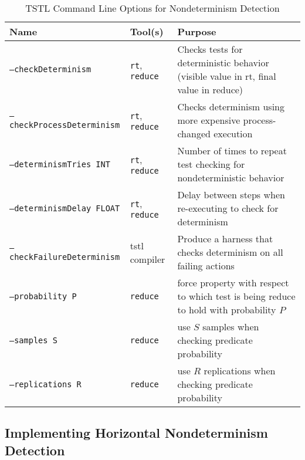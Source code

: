 \begin{table*}
\centering
{\scriptsize
\caption{TSTL Command Line Options for
  Nondeterminism Detection}
\label{tab:options}
\begin{tabular}{l|l|l}
Name &  Tool(s) & Purpose \\
\hline
\hline
{\tt --checkDeterminism} & {\tt rt}, {\tt reduce} & Checks tests for deterministic
                                  behavior (visible value in rt, final
  value in reduce)\\
\hline
{\tt --checkProcessDeterminism} & {\tt rt}, {\tt reduce} & Checks determinism using more 
                                         expensive process-changed 
                                         execution \\
\hline
{\tt --determinismTries INT} & {\tt rt}, {\tt reduce} & Number of times to repeat test 
                                  checking for nondeterministic
                                  behavior \\
\hline 
{\tt --determinismDelay FLOAT} & {\tt rt}, {\tt reduce} & Delay between steps when 
                                  re-executing to check for
                                              determinism \\
\hline 
{\tt --checkFailureDeterminism} & tstl compiler & Produce a harness
                                                  that checks
                                                  determinism on all
                                                  failing actions \\
\hline 
{\tt --probability P} & {\tt reduce} & force property with respect to which 
                               test is being reduce to hold with 
                                 probability $P$ \\
\hline 
{\tt --samples S} & {\tt reduce} & use $S$ samples when checking predicate
                             probability\\
\hline 
{\tt --replications R} & {\tt reduce} & use $R$ replications when checking predicate probability\\
\hline
\hline

\end{tabular}
}
\end{table*}

\subsection{Implementing Horizontal Nondeterminism Detection}

